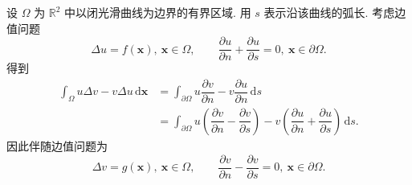 \begin{Example}
\label{ex:normal-tangential-adjoint-boundary-problem}
设 $\Omega$ 为 $\mathbb{R}^2$ 中以闭光滑曲线为边界的有界区域. 用 $s$ 表示沿该曲线的弧长. 考虑边值问题
\begin{equation}\label{eq:laplace-normal-tangential-boundary-problem}
\Delta u=f(\bm{x}),\ \bm{x}\in\Omega,\qquad\dfrac{\partial u}{\partial n}+\dfrac{\partial u}{\partial s}=0,\ \bm{x}\in\partial\Omega.
\end{equation}
得到
\begin{equation}\label{eq:laplace-normal-tangential-adjoint-calculation}
\begin{aligned}
\int_\Omega u\Delta v-v\Delta u\,\mathrm{d}\bm{x}
&=\int_{\partial\Omega}u\dfrac{\partial v}{\partial n}-v\dfrac{\partial u}{\partial n}\,\mathrm{d}s\\
&=\int_{\partial\Omega}u\left(\dfrac{\partial v}{\partial n}-\dfrac{\partial v}{\partial s}\right)
-v\left(\dfrac{\partial u}{\partial n}+\dfrac{\partial u}{\partial s}\right)\,\mathrm{d}s.
\end{aligned}
\end{equation}
因此伴随边值问题为
\begin{equation}\label{eq:laplace-normal-tangential-adjoint-problem}
\Delta v=g(\bm{x}),\ \bm{x}\in\Omega,\qquad\dfrac{\partial v}{\partial n}-\dfrac{\partial v}{\partial s}=0,\ \bm{x}\in\partial\Omega.
\end{equation}

\end{Example}
